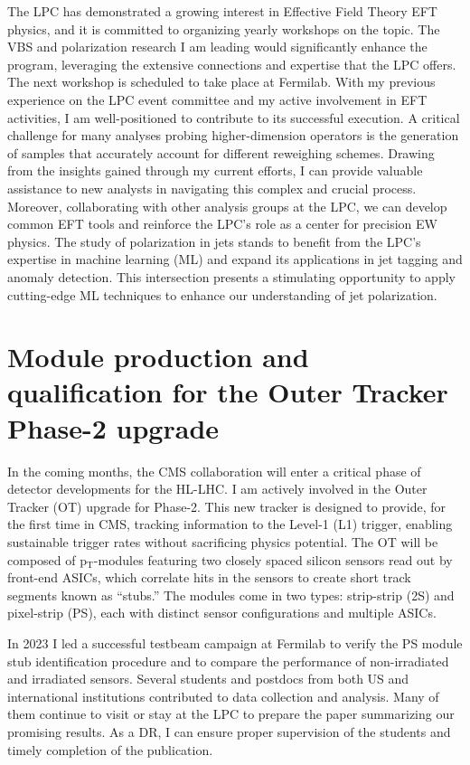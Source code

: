 {\begin{flushleft}
The LPC has demonstrated a growing interest in Effective Field Theory EFT physics, and it is committed to organizing yearly workshops on the topic. The VBS and polarization research I am leading would significantly enhance the program, leveraging the extensive connections and expertise that the LPC offers.
The next workshop is scheduled to take place at Fermilab. With my previous experience on the LPC event committee and my active involvement in EFT activities, I am well-positioned to contribute to its successful execution.
A critical challenge for many analyses probing higher-dimension operators is the generation of samples that accurately account for different reweighing schemes. Drawing from the insights gained through my current efforts, I can provide valuable assistance to new analysts in navigating this complex and crucial process. Moreover, collaborating with other analysis groups at the LPC, we can develop common EFT tools and reinforce the LPC's role as a center for precision EW physics.
The study of polarization in jets stands to benefit from the LPC's expertise in machine learning (ML) and expand its applications in jet tagging and anomaly detection. This intersection presents a stimulating opportunity to apply cutting-edge ML techniques to enhance our understanding of jet polarization.


\vspace{\baselineskip}
\section{Module production and qualification for the Outer Tracker Phase-2 upgrade}
\vspace{\baselineskip}
In the coming months, the CMS collaboration will enter a critical phase of detector developments for the HL-LHC.  I am actively involved in the Outer Tracker (OT) upgrade for Phase-2. This new tracker is designed to provide, for the first time in CMS, tracking information to the Level-1 (L1) trigger, enabling sustainable trigger rates without sacrificing physics potential. The OT will be composed of p$_{\mathrm{T}}$-modules featuring two closely spaced silicon sensors read out by front-end ASICs, which correlate hits in the sensors to create short track segments known as ``stubs.'' The modules come in two types: strip-strip (2S) and pixel-strip (PS), each with distinct sensor configurations and multiple ASICs.

In 2023 I led a successful testbeam campaign at Fermilab to verify the PS module stub identification procedure and to compare the performance of non-irradiated and irradiated sensors. Several students and postdocs from both US and international institutions contributed to data collection and analysis. Many of them continue to visit or stay at the LPC to prepare the paper summarizing our promising results. As a DR, I can ensure proper supervision of the students and timely completion of the publication.


\end{flushleft}}
